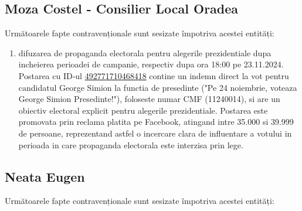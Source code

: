 \documentclass[a4paper,12pt]{article}
\begin{document}
\vspace{0.5cm}

\subsection{Moza Costel - Consilier Local Oradea}
Următoarele fapte contravenționale sunt sesizate împotriva acestei entități:

\begin{enumerate}[leftmargin=*, label=\arabic*.)]
    \item difuzarea de propaganda electorala pentru alegerile prezidentiale dupa incheierea perioadei de campanie, respectiv dupa ora 18:00 pe 23.11.2024. Postarea cu ID-ul \href{https://www.facebook.com/ads/library/?id=492771710468418}{492771710468418} contine un indemn direct la vot pentru candidatul George Simion la functia de presedinte ("Pe 24 noiembrie, voteaza George Simion Presedinte!"), foloseste numar CMF (11240014), si are un obiectiv electoral explicit pentru alegerile prezidentiale. Postarea este promovata prin reclama platita pe Facebook, atingand intre 35.000 si 39.999 de persoane, reprezentand astfel o incercare clara de influentare a votului in perioada in care propaganda electorala este interzisa prin lege.
\end{enumerate}

\vspace{0.5cm}

\subsection{Neata Eugen}
Următoarele fapte contravenționale sunt sesizate împotriva acestei entități:
\end{document}
